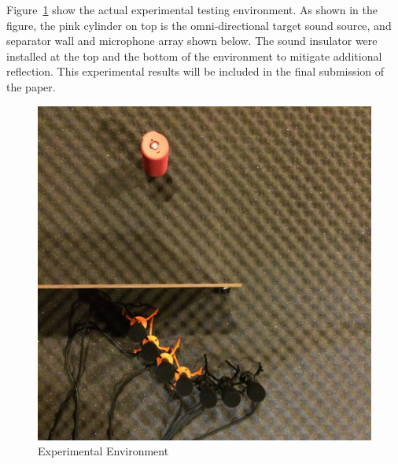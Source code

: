 \documentclass[letterpaper, 10 pt, conference]{ieeeconf}  %
\begin{document}
%
%
%
%
Figure~\ref{fig:exp} show the actual experimental testing environment. As shown in the figure, the pink cylinder on top is the omni-directional target sound source, and separator wall and microphone array shown below. The sound insulator were installed at the top and the bottom of the environment to mitigate additional reflection. This experimental results will be included in the final submission of the paper. 
\begin{figure}[thpb]
	\centering
	\includegraphics[width=0.7\columnwidth]{Figures/experiment.jpg} %
	\caption{Experimental Environment}
	\label{fig:exp}
\end{figure}
\end{document}
